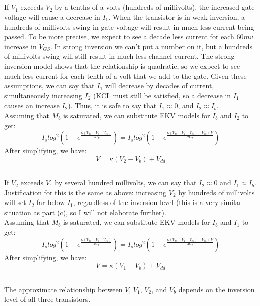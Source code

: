 \documentclass{article}
\begin{document}
\subsection{}
If $V_1$ exceeds $V_2$ by a tenths of a volts (hundreds of millivolts), the increased gate voltage will cause a decrease in $I_1$. When the transistor is in weak inversion, a hundreds of millivolts swing in gate voltage will result in much less current being passed. To be more precise, we expect to see a decade less current for each $60mv$ increase in $V_{GS}$. In strong inversion we can't put a number on it, but a hundreds of millivolts swing will still result in much less channel current. The strong inversion model shows that the relationship is quadratic, so we expect to see much less current for each tenth of a volt that we add to the gate. Given these assumptions, we can say that $I_1$ will decrease by decades of current, simultaneously increasing $I_2$ (KCL must still be satisfied, so a decrease in $I_1$ causes an increase $I_2$). Thus, it is safe to say that $I_1 \approx 0$, and $I_2 \approx I_b$.\\

Assuming that $M_b$ is saturated, we can substitute EKV models for $I_b$ and $I_2$ to get: \[I_slog^2(1+e^{\frac{\kappa(V_{dd}-V_{b}-V_{T0})}{2U_T}})=I_slog^2(1+e^{\frac{\kappa(V_{dd}-V_{2}-V_{T0})-V_{dd}+V}{2U_T}})\]
After simplifying, we have: \[V=\kappa(V_2-V_b)+V_{dd}\]
\subsection{}
If $V_2$ exceeds $V_1$ by several hundred millivolts, we can say that $I_2 \approx 0$ and $I_1 \approx I_b$. Justification for this is the same as above: increasing $V_2$ by hundreds of millivolts will set $I_2$ far below $I_1$, regardless of the inversion level (this is a very similar situation as part (c), so I will not elaborate further).\\

Assuming that $M_b$ is saturated, we can substitute EKV models for $I_b$ and $I_1$ to get: \[I_slog^2(1+e^{\frac{\kappa(V_{dd}-V_{b}-V_{T0})}{2U_T}})=I_slog^2(1+e^{\frac{\kappa(V_{dd}-V_{1}-V_{T0})-V_{dd}+V}{2U_T}})\]
After simplifying, we have: \[V=\kappa(V_1-V_b)+V_{dd}\]
\subsection{}
The approximate relationship between $V$, $V_1$, $V_2$, and $V_b$ depends on the inversion level of all three transistors. 
\end{document}
